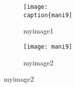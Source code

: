 \documentclass{article}
\begin{document}
	\begin{figure}[h]
		\centering
		\begin{subfigure}[b]{0.5\textwidth}
			\centering
			\texttt{[image: \\caption\{mani9]}
		    \caption{myimage1}
		\end{subfigure}
	\hfill
	\begin{subfigure}[b]{0.5\textwidth}
		\centering
		\texttt{[image: mani9]}
		\caption{myimage2}
	\end{subfigure}
\end{figure}
\end{document}

